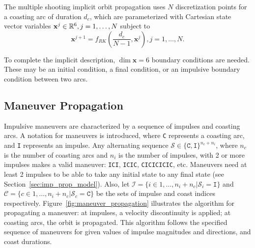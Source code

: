 The multiple shooting implicit orbit propagation uses \(N\) discretization points for a coasting arc of duration \(d_c\), which are parameterized with Cartesian state vector variables \(\mathbf{x}^j \in \mathbb{R}^6, j=1,\dots,N\) subject to 
\begin{equation}
    \mathbf{x}^{j+1} = f_{RK}(\frac{d_c}{N - 1}, \mathbf{x}^j), j = 1, \dots, N.
\end{equation}

To complete the implicit description, \(\dim \mathbf{x} = 6\) boundary conditions are needed. These may be an initial condition, a final condition, or an impulsive boundary condition between two arcs.


\subsection{Maneuver Propagation}\label{sec:maneuver_propagation}

Impulsive maneuvers are characterized by a sequence of impulses and coasting arcs. A notation for maneuvers is introduced, where \texttt{C} represents a coasting arc, and \texttt{I} represents an impulse. Any alternating sequence \(\mathcal{S} \in \{\texttt{C}, \texttt{I}\}^{n_c + n_i}\), where \(n_c\) is the number of coasting arcs and \(n_i\) is the number of impulses, with 2 or more impulses makes a valid maneuver: \texttt{ICI}, \texttt{ICIC}, \texttt{CICICICIC}, etc. Maneuvers need at least 2 impulses to be able to take any initial state to any final state (see Section~\ref{sec:imp_prop_model}). Also, let \(\mathcal{I} = \{i \in 1,\dots,n_i+n_c | \mathcal{S}_i = \texttt{I}\}\) and \(\mathcal{C} = \{c \in 1,\dots,n_i+n_c | \mathcal{S}_c = \texttt{C}\}\) be the sets of impulse and coast indices respectively. Figure~\ref{fig:maneuver_propagation} illustrates the algorithm for propagating a maneuver: at impulses, a velocity discontinuity is applied; at coasting arcs, the orbit is propagated. This algorithm follows the specified sequence of maneuvers for given values of impulse magnitudes and directions, and coast durations. 

